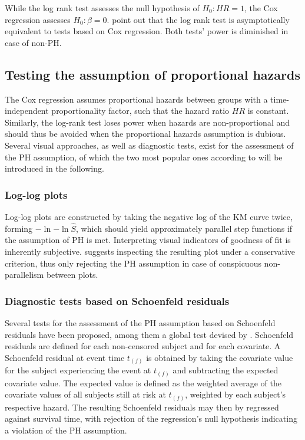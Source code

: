 \documentclass[main.tex]{subfiles}
\begin{document}
While the log rank test assesses the null hypothesis of $H_0: HR=1$, the Cox regression assesses $H_0: \beta = 0$. \textcite{Royston2011-bd} point out that the log rank test is asymptotically equivalent to tests based on Cox regression. Both tests' power is diminished in case of non-PH.

\subsection{Testing the assumption of proportional hazards}
The Cox regression assumes proportional hazards between groups with a time-independent proportionality factor, such that the hazard ratio $HR$ is constant. Similarly, the log-rank test loses power when hazards are non-proportional \parencite{karrison2016versatile} and should thus be avoided when the proportional hazards assumption is dubious. Several visual approaches, as well as diagnostic tests, exist for the assessment of the PH assumption, of which the two most popular ones according to \textcite{kuitunen2021testing} will be introduced in the following.

\subsubsection{Log-log plots}
Log-log plots are constructed by taking the negative log of the KM curve twice, forming $-\ln{-\ln{\hat{S}}}$, which should yield approximately parallel step functions if the assumption of PH is met. Interpreting visual indicators of goodness of fit is inherently subjective. \textcite{kleinbaum2012survival} suggests inspecting the resulting plot under a conservative criterion, thus only rejecting the PH assumption in case of conspicuous non-parallelism between plots.
\subsubsection{Diagnostic tests based on Schoenfeld residuals}
Several tests for the assessment of the PH assumption based on Schoenfeld residuals have been proposed, among them a global test devised by \parencite{grambsch1994proportional}. Schoenfeld residuals are defined for each non-censored subject and for each covariate. A Schoenfeld residual at event time $t_{(f)}$ is obtained by taking the covariate value for the subject experiencing the event at $t_{(f)}$ and subtracting the expected covariate value. The expected value is defined as the weighted average of the covariate values of all subjects still at risk at $t_{(f)}$, weighted by each subject's respective hazard. The resulting Schoenfeld residuals may then by regressed against survival time, with rejection of the regression's null hypothesis indicating a violation of the PH assumption.
\end{document}
